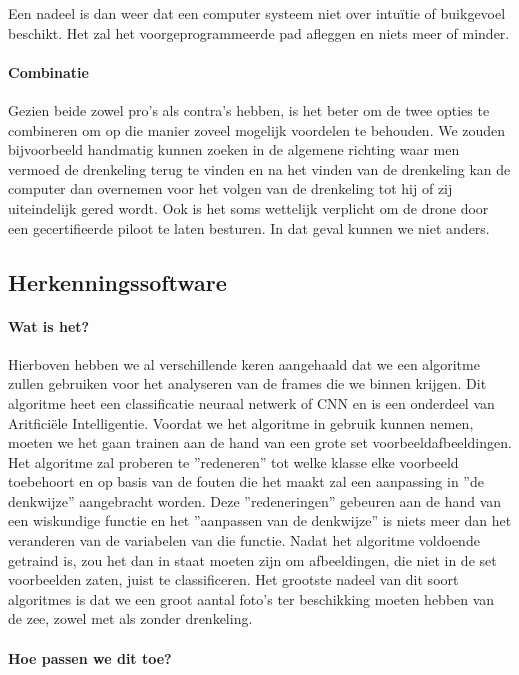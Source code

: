 Een nadeel is dan weer dat een computer systeem niet over intuïtie of buikgevoel beschikt. Het zal het voorgeprogrammeerde pad afleggen en niets meer of minder.  

\paragraph{Combinatie}

Gezien beide zowel pro's als contra's hebben, is het beter om de twee opties te combineren om op die manier zoveel mogelijk voordelen te behouden. We zouden bijvoorbeeld handmatig kunnen zoeken in de algemene richting waar men vermoed de drenkeling terug te vinden en na het vinden van de drenkeling kan de computer dan overnemen voor het volgen van de drenkeling tot hij of zij uiteindelijk gered wordt. Ook is het soms wettelijk verplicht om de drone door een gecertifieerde piloot te laten besturen. In dat geval kunnen we niet anders.

\subsection{Herkenningssoftware}

\paragraph{Wat is het?}

Hierboven hebben we al verschillende keren aangehaald dat we een algoritme zullen gebruiken voor het analyseren van de frames die we binnen krijgen. Dit algoritme heet een classificatie neuraal netwerk of CNN en is een onderdeel van Aritficiële Intelligentie. Voordat we het algoritme in gebruik kunnen nemen, moeten we het gaan trainen aan de hand van een grote set voorbeeldafbeeldingen. Het algoritme zal proberen te ''redeneren'' tot welke klasse elke voorbeeld toebehoort en op basis van de fouten die het maakt zal een aanpassing in ''de denkwijze'' aangebracht worden. Deze ''redeneringen'' gebeuren aan de hand van een wiskundige functie en het ''aanpassen van de denkwijze'' is niets meer dan het veranderen van de variabelen van die functie. Nadat het algoritme voldoende getraind is, zou het dan in staat moeten zijn om afbeeldingen, die niet in de set voorbeelden zaten, juist te classificeren. Het grootste nadeel van dit soort algoritmes is dat we een groot aantal foto's ter beschikking moeten hebben van de zee, zowel met als zonder drenkeling.

\paragraph{Hoe passen we dit toe?}

